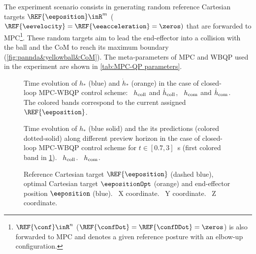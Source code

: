 The experiment scenario consists in generating random reference Cartesian targets $\REF{\eeposition}\inR^{m}$ ($\REF{\eevelocity}=\REF{\eeacceleration}=\zeros)$ that are forwarded to MPC\footnote{$\REF{\conf}\inR^{n}$ ($\REF{\confDot}=\REF{\confDDot}=\zeros$) is also forwarded to MPC and denotes a given reference posture with an elbow-up configuration.}. These random targets aim to lead the end-effector into a collision with the ball and the CoM to reach its maximum boundary (\cref{fig:pannda&yellowball&CoM}).
The meta-parameters of MPC and WBQP used in the experiment are shown in \cref{tab:MPC-QP parameters}.
\begin{figure}
	\centering
	\caption{Time evolution of $h_{*}$ (blue) and $\dot{h}_{*}$ (orange) in the case of closed-loop MPC-WBQP control scheme:~ $h_{\rm coll}$ and $\dot{h}_{\rm coll}$,~ $h_{\rm com}$ and $\dot{h}_{\rm com}$. The colored bands correspond to the current assigned $\REF{\eeposition}$.}
	\label{fig:hcoll and hcom MPC}
\end{figure}
\begin{figure}
	\centering
	\caption{Time evolution of $h_{*}$ (blue solid) and the its predictions (colored dotted-solid) along different preview horizon in the case of closed-loop MPC-WBQP control scheme for $t\in\left[0.7,3\right]$~s (first colored band in \cref{fig:hcoll and hcom MPC}).~ $h_{\rm coll}$.~ $h_{\rm com}$.}
	\label{fig:hcoll and hcom  prediction MPC}
\end{figure}
\begin{figure}
	\centering
	\caption{Reference Cartesian target $\REF{\eeposition}$ (dashed blue), optimal Cartesian target $\eepositionOpt$ (orange) and end-effector position $\eeposition$ (blue).~ X coordinate.~ Y coordinate.~ Z coordinate.}
	\label{fig:optimal target MPC}	
\end{figure}

